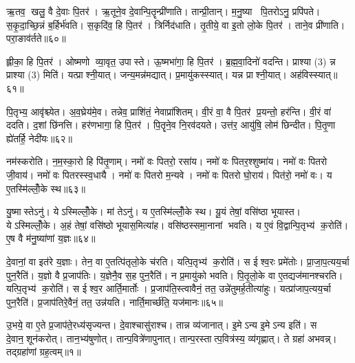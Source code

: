 ऋ॒तव॒ खलु॒ वै दे॒वाः पि॒तर॑। ऋ॒तूने॒व दे॒वान्पि॒तॄन्प्री॑णाति। तान्प्री॒तान्। म॒नु॒ष्या पि॒तरोऽनु॒ प्रपि॑पते। स॒कृ॒दा॒च्छि॒न्नं ब॒र्\mbox{}हिर्भ॑वति। स॒कृदि॑व॒ हि पि॒तर॑। त्रिर्निद॑धाति। तृ॒तीये॒ वा इ॒तो लो॒के पि॒तर॑। ताने॒व प्री॑णाति। परा॒ङाव॑र्तते॥६०॥

ह्लीका॒ हि पि॒तर॑। ओष्मणो व्या॒वृत॒ उपास्ते। ऊ॒ष्मभा॑गा॒ हि पि॒तर॑। ब्र॒ह्म॒वा॒दिनो॑ वदन्ति। प्राश्या (3) न्न प्राश्या (3) मिति॑। यत्प्राश्नी॒यात्। जन्य॒मन्न॑मद्यात्। प्र॒मायु॑कस्स्यात्। यन्न प्राश्नी॒यात्। अह॑विस्स्यात्॥६१॥

पि॒तृभ्य॒ आवृ॑श्च्येत। अ॒व॒घ्रेय॑मे॒व। तन्नेव॒ प्राशि॑तं॒ नेवाप्रा॑शितम्। वी॒रं वा॒ वै पि॒तर॑ प्र॒यन्तो॒ हर॑न्ति। वी॒रं वा॑ ददति। द॒शां छि॑नत्ति। हर॑णभागा॒ हि पि॒तर॑। पि॒तॄने॒व नि॒रव॑दयते। उत्त॑र॒ आयु॑षि॒ लोम॑ छिन्दीत। पि॒तृ॒णा ह्ये॑तर्\mbox{}हि॒ नेदी॑यः॥६२॥

नम॑स्करोति। न॒म॒स्का॒रो हि पि॑तृ॒णाम्। नमो॑ वः पितरो॒ रसा॑य। नमो॑ वः पितर॒श्शुष्मा॑य। नमो॑ वः पितरो जी॒वाय॑। नमो॑ वः पितरस्स्व॒धायै। नमो॑ वः पितरो म॒न्यवे। नमो॑ वः पितरो घो॒राय॑। पित॑रो॒ नमो॑ वः। य ए॒तस्मि॑ल्लोँ॒के स्थ॥६३॥

यु॒ष्मास्तेऽनु॑। येऽस्मिल्लोँ॒के। मां तेऽनु॑। य ए॒तस्मि॑ल्लोँ॒के स्थ। यू॒यं तेषां॒ वसि॑ष्ठा भूयास्त। येऽस्मिल्लोँ॒के। अ॒हं तेषां॒ वसि॑ष्ठो भूयास॒मित्या॑ह। वसि॑ष्ठस्समा॒नानां भवति। य ए॒वं वि॒द्वान्पि॒तृभ्य॑ क॒रोति॑। ए॒ष वै म॑नु॒ष्या॑णां य॒ज्ञः॥६४॥

दे॒वानां॒ वा इत॑रे य॒ज्ञाः। तेन॒ वा ए॒तत्पि॑तृलो॒के च॑रति। यत्पि॒तृभ्य॑ क॒रोति॑। स ईश्व॒रः प्रमे॑तोः। प्रा॒जा॒प॒त्यय॒र्चा पुन॒रैति॑। य॒ज्ञो वै प्र॒जाप॑तिः। य॒ज्ञेनै॒व स॒ह पुन॒रैति॑। न प्र॒मायु॑को भवति। पि॒तृ॒लो॒के वा ए॒तद्यज॑मानश्चरति। यत्पि॒तृभ्य॑ क॒रोति॑। स ईश्व॒र आर्ति॒मार्तोः। प्र॒जाप॑ति॒स्त्वावैनं॒ तत॒ उन्ने॑तुमर्\mbox{}ह॒तीत्या॑हुः। यत्प्रा॑जाप॒त्यय॒र्चा पुन॒रैति॑। प्र॒जाप॑तिरे॒वैनं॒ तत॒ उन्न॑यति। नार्ति॒मार्च्छ॑ति॒ यज॑मानः॥६५॥



\clearpage
{}
\setcounter{anuvakam}{0}
उ॒भये॒ वा ए॒ते प्र॒जाप॑ते॒रध्य॑सृज्यन्त। दे॒वाश्चासु॑राश्च। तान्न व्य॑जानात्। इ॒मेऽन्य इ॒मेऽन्य इति॑। स दे॒वान॒शून॑करोत्। तान॒भ्य॑षुणोत्। तान्प॒वित्रे॑णापुनात्। तान्प॒रस्तात्प॒वित्र॑स्य॒ व्य॑गृह्णात्। ते ग्रहा॑ अभवन्न्। तद्ग्रहा॑णां ग्रह॒त्वम्॥१॥

